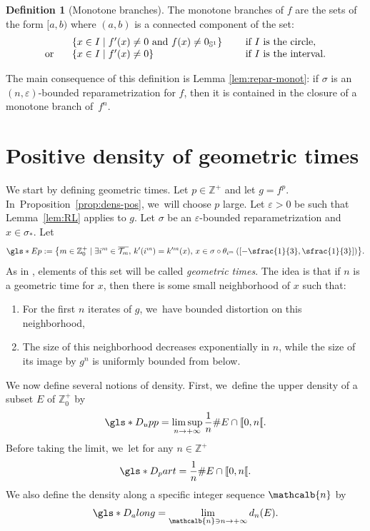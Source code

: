 \documentclass[10pt]{amsart}
\newenvironment{enumeratei}
{\bgroup\def\theenumi{\roman{enumi}}\def\theenumii{\arabic{enumii}}\begin{enumerate}}
{\end{enumerate}\egroup}
\newcommand{\mcbn}{{\mathcalb{n}}}
\theoremstyle{definition}
\newtheorem{definition}[thm]{Definition}
\newcommand{\bbS}{{\mathbb{S}}}
\newcommand{\bbZ}{{\mathbb{Z}}}
\begin{document}
\begin{definition}[Monotone branches]
\label{def:monot-branche}
The monotone branches of $f$ are the sets of the form $[a,b)$ where $(a,b)$ is a connected component of the set:
\[
\begin{array}{l l l}
&\{ x \in I \mid f'(x) \neq 0 \text{ and } f(x) \neq 0_{\bbS^1} \} \quad &\text{ if } I \text{ is the circle},\\
\text{or}\;\;\;
&\{ x \in I \mid f'(x) \neq 0 \} &\text{ if } I \text{ is the interval}.
\end{array}
\]
\end{definition}

The main consequence of this definition is Lemma \ref{lem:repar-monot}: if $\sigma$ is an $(n, \varepsilon)$-bounded reparametrization for $f$, then it is contained in the closure of a monotone branch of~$f^n$.

\section{Positive density of geometric times}
\label{sec:dens-geom}

We start by defining geometric times.
Let $p \in \bbZ^+$ and let $g = f^p$. In~Proposition~\ref{prop:dens-pos}, we~will choose $p$ large.
Let $\varepsilon > 0$ be such that Lemma~\ref{lem:RL} applies to $g$. Let $\sigma$ be an $\varepsilon$-bounded reparametrization and $x \in \sigma_*$.
Let
\[
\gls*{Ep} := \bigl \{ m \in \bbZ_0^+ \mid \exists i^m \in \overline{\mathcal{T}_m},\, k'(i^m) = k'^m(x),\, x \in \sigma \circ \theta_{i^m} \left (\left [ - \sfrac{1}{3}, \sfrac{1}{3} \right ] \right) \bigr \}.
\]
As in \cite{MR4701884}, elements of this set will be called \textit{geometric times}.
The idea is that if $n$ is a geometric time for $x$, then there is some small neighborhood of $x$ such that:
\begin{enumeratei}
\item
For the first $n$ iterates of $g$, we~have bounded distortion on this neighborhood,
\item
The size of this neighborhood decreases exponentially in $n$, while the size of its image by $g^n$ is uniformly bounded from below.
\end{enumeratei}

We now define several notions of density. First, we~define the upper density of a subset $E$ of $\bbZ_0^+$ by
\[
\gls*{D_upp} = \limsup_{n \to +\infty} \frac{1}{n} \# E \cap [\![ 0, n [\![.
\]
Before taking the limit, we~let for any $n \in \mathbb{Z^+}$
\[
\gls*{D_part} = \frac{1}{n} \# E \cap [\![ 0, n [\![.
\]
We also define the density along a specific integer sequence $\mcbn$ by
\[
\gls*{D_along} = \lim_{\mcbn \ni n \to +\infty} d_n(E).
\]
\end{document}
